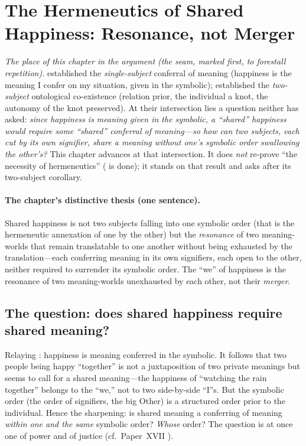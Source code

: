 \section{The Hermeneutics of Shared Happiness: Resonance, not Merger}
\label{p19:sec:coexistence}

\noindent
\emph{The place of this chapter in the argument (the seam, marked first, to forestall repetition).}  established the \emph{single-subject} conferral of meaning (happiness is the meaning I confer on my situation, given in the symbolic);  established the \emph{two-subject} ontological co-existence (relation prior, the individual a knot, the autonomy of the knot preserved). At their intersection lies a question neither has asked: \emph{since happiness is meaning given in the symbolic, a ``shared'' happiness would require some ``shared'' conferral of meaning---so how can two subjects, each cut by its own signifier, share a meaning without one's symbolic order swallowing the other's?} This chapter advances at that intersection. It does \emph{not} re-prove ``the necessity of hermeneutics'' ( is done); it stands on that result and asks after its two-subject corollary.

\paragraph{The chapter's distinctive thesis (one sentence).} Shared happiness is not two subjects falling into one symbolic order (that is the hermeneutic annexation of one by the other) but the \emph{resonance} of two meaning-worlds that remain translatable to one another without being exhausted by the translation---each conferring meaning in its own signifiers, each open to the other, neither required to surrender its symbolic order. The ``we'' of happiness is the resonance of two meaning-worlds unexhausted by each other, not their \emph{merger}.

\subsection{The question: does shared happiness require shared meaning?}
\label{p19:sub:coex-question}

Relaying : happiness is meaning conferred in the symbolic. It follows that two people being happy ``together'' is not a juxtaposition of two private meanings but seems to call for a shared meaning---the happiness of ``watching the rain together'' belongs to the ``we,'' not to two side-by-side ``I''s. But the symbolic order (the order of signifiers, the big Other) is a structured order prior to the individual. Hence the sharpening: is shared meaning a conferring of meaning \emph{within one and the same} symbolic order? \emph{Whose} order? The question is at once one of power and of justice (cf.\ Paper~XVII \parencite{paperxvii}).

